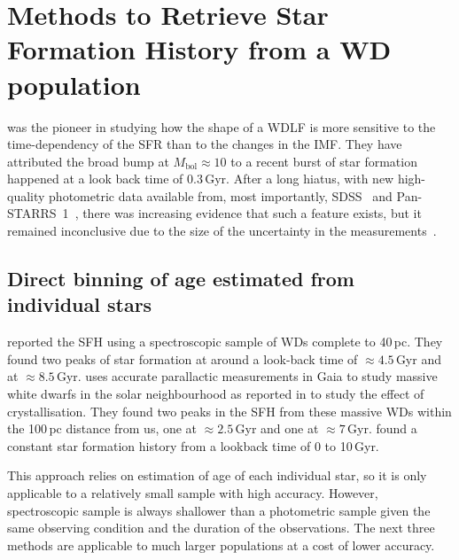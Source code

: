 \documentclass[fleqn,usenatbib]{mnras}
\begin{document}
\section{Methods to Retrieve Star Formation History from a WD population}
\citet{1990ApJ...352..605N} was the pioneer in studying how the shape of
a WDLF is more sensitive to the time-dependency of the SFR than to the changes
in the IMF. They have attributed the broad bump at $M_{\mathrm{bol}} \approx 10$
to a recent burst of star formation happened at a look back time of 0.3\,Gyr.
After a long hiatus, with new high-quality photometric data available from,
most importantly, SDSS~\citep{2000AJ....120.1579Y} and
Pan-STARRS~1~\citep{2016arXiv161205560C}, there was increasing evidence that
such a feature exists, but it remained inconclusive due to the size of the
uncertainty in the measurements~\citep{2006AJ....131..571H, 2011MNRAS.417...93R,
2019MNRAS.482..715L}.

\subsection{Direct binning of age estimated from individual stars}
\citet[][hereafter, T14]{2014ApJ...791...92T} reported the SFH using a
spectroscopic sample of WDs complete to 40\,pc. They found two peaks of star
formation at around a look-back time of $\approx4.5$\,Gyr and at 
$\approx8.5$\,Gyr. \citet{2019ApJ...878L..11I} uses accurate parallactic 
measurements in Gaia to study massive white dwarfs in the solar neighbourhood as
reported in \citet{2019Natur.565..202T} to study the effect of crystallisation. 
They found two peaks in the SFH from these massive WDs within the 100\,pc
distance from us, one at $\approx2.5$\,Gyr and one at $\approx7$\,Gyr.
\citet[][hereafter, C23]{2023MNRAS.522.1643C} found a constant star formation
history from a lookback time of 0 to 10\,Gyr.

This approach relies on estimation of age of each individual star, so it is
only applicable to a relatively small sample with high accuracy. However,
spectroscopic sample is always shallower than a photometric sample given the
same observing condition and the duration of the observations. The next three 
methods are applicable to much larger populations at a cost of lower accuracy.

\end{document}
